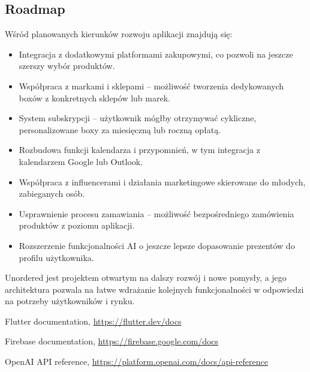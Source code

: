 \documentclass[a4paper, 12pt]{article}
\begin{document}
\subsection{Roadmap}
Wśród planowanych kierunków rozwoju aplikacji znajdują się:
\begin{itemize}
    \item Integracja z dodatkowymi platformami zakupowymi, co pozwoli na jeszcze szerszy wybór produktów.
    \item Współpraca z markami i sklepami -- możliwość tworzenia dedykowanych boxów z konkretnych sklepów lub marek.
    \item System subskrypcji -- użytkownik mógłby otrzymywać cykliczne, personalizowane boxy za miesięczną lub roczną opłatą.
    \item Rozbudowa funkcji kalendarza i przypomnień, w tym integracja z kalendarzem Google lub Outlook.
    \item Współpraca z influencerami i działania marketingowe skierowane do młodych, zabieganych osób.
    \item Usprawnienie procesu zamawiania -- możliwość bezpośredniego zamówienia produktów z poziomu aplikacji.
    \item Rozszerzenie funkcjonalności AI o jeszcze lepsze dopasowanie prezentów do profilu użytkownika.
\end{itemize}

Unordered jest projektem otwartym na dalszy rozwój i nowe pomysły,
a jego architektura pozwala na łatwe wdrażanie kolejnych funkcjonalności
w odpowiedzi na potrzeby użytkowników i rynku.

\begin{thebibliography}{9}
Flutter documentation, \url{https://flutter.dev/docs}

Firebase documentation, \url{https://firebase.google.com/docs}

OpenAI API reference, \url{https://platform.openai.com/docs/api-reference}
\end{thebibliography}
\end{document}
